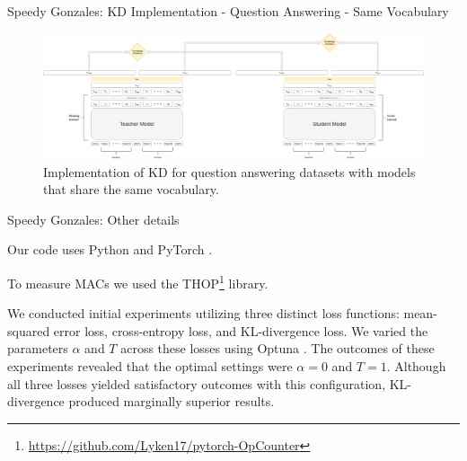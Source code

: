 \documentclass[aspectratio=169,xcolor=dvipsnames]{beamer}
\newenvironment{wideitemize}{\itemize\addtolength{\itemsep}{10pt}}{\enditemize}
\begin{document}
\begin{frame}{Speedy Gonzales: KD Implementation - Question Answering - Same Vocabulary}

\begin{figure}
    \centering
    \includegraphics[width=\columnwidth]{images/KD-QA-same-vocabulary.pdf}
    \caption{Implementation of KD for question answering datasets with models that share the same vocabulary.}
    \label{fig:KD-QA-same-vocabulary}
\end{figure}

\end{frame}
\begin{frame}{Speedy Gonzales: Other details}

\begin{wideitemize}
    \item Our code uses Python and PyTorch \citep{pytorch-paper}.
    \item To measure MACs we used the THOP\footnote{\url{https://github.com/Lyken17/pytorch-OpCounter}} library.
    \item We conducted initial experiments utilizing three distinct loss functions: mean-squared error loss, cross-entropy loss, and KL-divergence loss. We varied the parameters $\alpha$ and $T$ across these losses using Optuna \citep{optuna-DBLP:conf/kdd/AkibaSYOK19}. The outcomes of these experiments revealed that the optimal settings were $\alpha = 0$ and $T = 1$. Although all three losses yielded satisfactory outcomes with this configuration, KL-divergence produced marginally superior results.
\end{wideitemize}

\end{frame}
\end{document}

